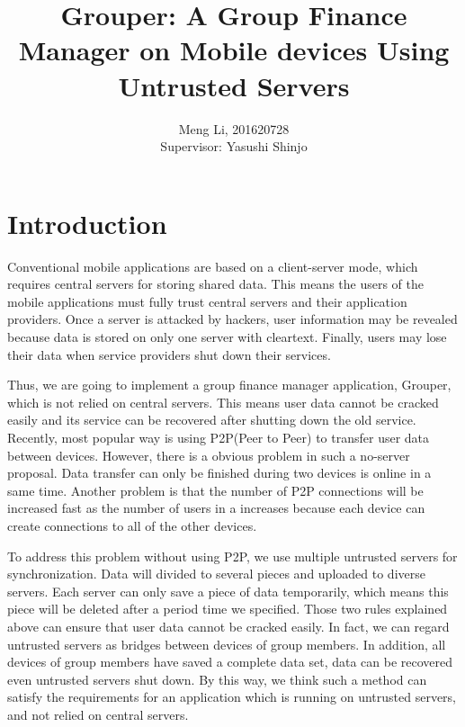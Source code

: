 \documentclass[twocolumn,10pt]{article}
\begin{document}
\date{}

\title{\bf Grouper: A Group Finance Manager on Mobile devices Using Untrusted Servers}

\author{
	Meng Li, 201620728  
	\\ Supervisor: Yasushi Shinjo
}

\maketitle

\section{Introduction}
Conventional mobile applications are based on a client-server mode, which requires central servers for storing shared data. This means the users of the mobile applications must fully trust central servers and their application providers. Once a server is attacked by hackers, user information may be revealed because data is stored on only one server with cleartext. Finally, users may lose their data when service providers shut down their services.

Thus, we are going to implement a group finance manager application, Grouper, which is not relied on central servers. This means user data cannot be cracked easily and its service can be recovered after shutting down the old service. Recently, most popular way is using P2P(Peer to Peer) to transfer user data between devices. However, there is a obvious problem in such a no-server proposal. Data transfer can only be finished during two devices is online in a same time. Another problem is that the number of P2P connections will be increased fast as the number of users in a increases because each device can create  connections to all of the other devices. 

To address this problem without using P2P, we use multiple untrusted servers for synchronization. Data will divided to several pieces and uploaded to diverse servers. Each server can only save a piece of data temporarily, which means this piece will be deleted after a period time we specified. Those two rules explained above can ensure that user data cannot be cracked easily. In fact, we can regard untrusted servers as bridges between devices of group members. In addition, all devices of group members have saved a complete data set, data can be recovered even untrusted servers shut down. By this way, we think such a method can satisfy the requirements for an application which is running on untrusted servers, and not relied on central servers.
\end{document}
